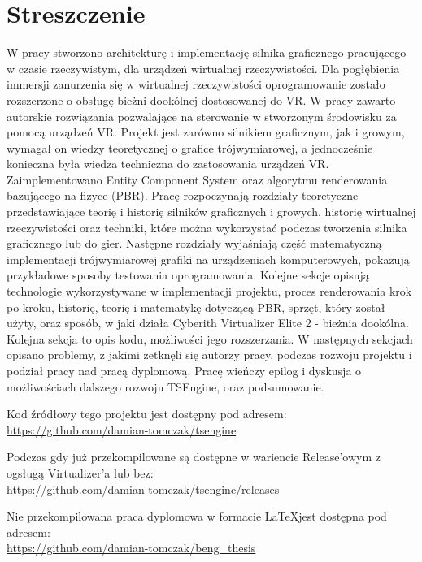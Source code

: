 \section{Streszczenie}
\hspace{\parindent}
W pracy stworzono architekturę i implementację silnika graficznego pracującego w czasie rzeczywistym, dla urządzeń wirtualnej rzeczywistości. Dla pogłębienia immersji zanurzenia się w wirtualnej rzeczywistości oprogramowanie zostało rozszerzone o obsługę bieżni dookólnej dostosowanej do VR. W pracy zawarto autorskie rozwiązania pozwalające na sterowanie w stworzonym środowisku za pomocą urządzeń VR. Projekt jest zarówno silnikiem graficznym, jak i growym, wymagał on wiedzy teoretycznej o grafice trójwymiarowej, a jednocześnie konieczna była wiedza techniczna do zastosowania urządzeń VR. Zaimplementowano Entity Component System oraz algorytmu renderowania bazującego na fizyce (PBR). Pracę rozpoczynają rozdziały teoretyczne przedstawiające teorię i historię silników graficznych i growych, historię wirtualnej rzeczywistości oraz techniki, które można wykorzystać podczas tworzenia silnika graficznego lub do gier. Następne rozdziały wyjaśniają część matematyczną implementacji trójwymiarowej grafiki na urządzeniach komputerowych, pokazują przykładowe sposoby testowania oprogramowania. Kolejne sekcje opisują technologie wykorzystywane w implementacji projektu, proces renderowania krok po kroku, historię, teorię i matematykę dotyczącą PBR, sprzęt, który został użyty, oraz sposób, w jaki działa Cyberith Virtualizer Elite 2 - bieżnia dookólna. Kolejna sekcja to opis kodu, możliwości jego rozszerzania. W następnych sekcjach opisano problemy, z jakimi zetknęli się autorzy pracy, podczas rozwoju projektu i podział pracy nad pracą dyplomową. Pracę wieńczy epilog i dyskusja o możliwościach dalszego rozwoju TSEngine, oraz podsumowanie.


Kod źródłowy tego projektu jest dostępny pod adresem:\\
\href{https://github.com/damian-tomczak/tsengine}{https://github.com/damian-tomczak/tsengine}

Podczas gdy już przekompilowane są dostępne w wariencie Release'owym z ogsługą Virtualizer'a lub bez:\\
\href{https://github.com/damian-tomczak/tsengine/releases}{https://github.com/damian-tomczak/tsengine/releases}

Nie przekompilowana praca dyplomowa w formacie \LaTeX jest dostępna pod adresem:\\
\href{https://github.com/damian-tomczak/beng_thesis}{https://github.com/damian-tomczak/beng\_thesis}

